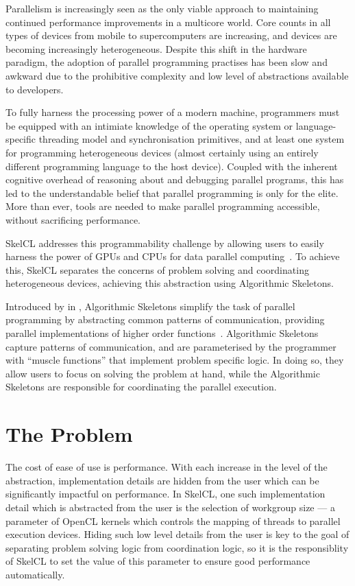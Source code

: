 Parallelism is increasingly seen as the only viable approach to
maintaining continued performance improvements in a multicore
world. Core counts in all types of devices from mobile to
supercomputers are increasing, and devices are becoming increasingly
heterogeneous. Despite this shift in the hardware paradigm, the
adoption of parallel programming practises has been slow and awkward
due to the prohibitive complexity and low level of abstractions
available to developers.

To fully harness the processing power of a modern machine, programmers
must be equipped with an intimiate knowledge of the operating system
or language-specific threading model and synchronisation primitives,
and at least one system for programming heterogeneous devices (almost
certainly using an entirely different programming language to the host
device). Coupled with the inherent cognitive overhead of reasoning
about and debugging parallel programs, this has led to the
understandable belief that parallel programming is only for the
elite. More than ever, tools are needed to make parallel programming
accessible, without sacrificing performance.

SkelCL addresses this programmability challenge by allowing users to
easily harness the power of GPUs and CPUs for data parallel
computing~\cite{Steuwer2011}. To achieve this, SkelCL separates the
concerns of problem solving and coordinating heterogeneous devices,
achieving this abstraction using Algorithmic Skeletons.

Introduced by \citeauthor{Cole1989} in \citeyear{Cole1989},
Algorithmic Skeletons simplify the task of parallel programming by
abstracting common patterns of communication, providing parallel
implementations of higher order functions~\cite{Cole1989}. Algorithmic
Skeletons capture patterns of communication, and are parameterised by
the programmer with ``muscle functions'' that implement problem
specific logic. In doing so, they allow users to focus on solving the
problem at hand, while the Algorithmic Skeletons are responsible for
coordinating the parallel execution.


\section{The Problem}

The cost of ease of use is performance. With each increase in the
level of the abstraction, implementation details are hidden from the
user which can be significantly impactful on performance. In SkelCL,
one such implementation detail which is abstracted from the user is
the selection of workgroup size --- a parameter of OpenCL kernels
which controls the mapping of threads to parallel execution
devices. Hiding such low level details from the user is key to the
goal of separating problem solving logic from coordination logic, so
it is the responsiblity of SkelCL to set the value of this parameter
to ensure good performance automatically.

